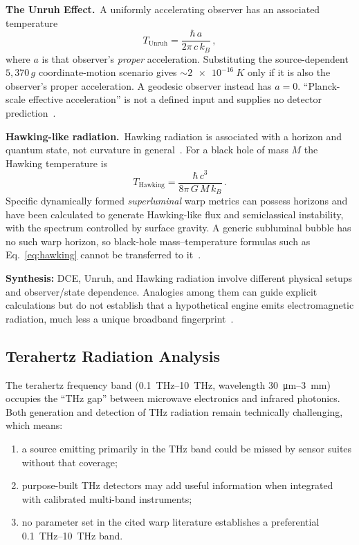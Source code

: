 \documentclass[aps,prd,twocolumn,superscriptaddress,nofootinbib,floatfix]{revtex4-2}
\begin{document}
\textbf{The Unruh Effect.}\ A uniformly accelerating observer has an associated
temperature~\cite{Unruh1976}
\begin{equation}\label{eq:unruh}
  T_{\text{Unruh}} = \frac{\hbar\,a}{2\pi\,c\,k_{B}}\,,
\end{equation}
where $a$ is that observer's \emph{proper} acceleration. Substituting the
source-dependent $5{,}370\,g$ coordinate-motion scenario gives
${\sim}\SI{2e-16}{K}$ only if it is also the observer's proper acceleration. A
geodesic observer instead has $a=0$. ``Planck-scale effective acceleration'' is not
a defined input and supplies no detector prediction~\cite{Unruh1976}.

\textbf{Hawking-like radiation.}\ Hawking radiation is associated with a horizon
and quantum state, not curvature in general~\cite{Hawking1974,Hawking1975}. For a
black hole of mass $M$ the Hawking temperature is
\begin{equation}\label{eq:hawking}
  T_{\text{Hawking}} = \frac{\hbar\,c^{3}}{8\pi\,G\,M\,k_{B}}\,.
\end{equation}
Specific dynamically formed \emph{superluminal} warp metrics can possess horizons
and have been calculated to generate Hawking-like flux and semiclassical
instability, with the spectrum controlled by surface gravity. A generic subluminal
bubble has no such warp horizon, so black-hole mass--temperature formulas such as
Eq.~\eqref{eq:hawking} cannot be transferred to
it~\cite{Alcubierre1994,Schutzhold2011,Finazzi2009}.

\textbf{Synthesis:} DCE, Unruh, and Hawking radiation involve different physical
setups and observer/state dependence. Analogies among them can guide explicit
calculations but do not establish that a hypothetical engine emits
electromagnetic radiation, much less a unique broadband
fingerprint~\cite{Wilson2011,Hawking1974,Hawking1975,Unruh1976,Schutzhold2011}.

\subsection{Terahertz Radiation Analysis}\label{sec:thz}

The terahertz frequency band (\SIrange{0.1}{10}{THz}, wavelength
\SI{30}{\micro\metre}--\SI{3}{\milli\metre}) occupies the ``THz gap'' between
microwave electronics and infrared photonics. Both generation and detection of THz
radiation remain technically challenging, which means:
\begin{enumerate}
  \item a source emitting primarily in the THz band could be missed by sensor
        suites without that coverage;
  \item purpose-built THz detectors may add useful information when integrated
        with calibrated multi-band instruments;
  \item no parameter set in the cited warp literature establishes a preferential
        \SIrange{0.1}{10}{THz} band.
\end{enumerate}
\end{document}
